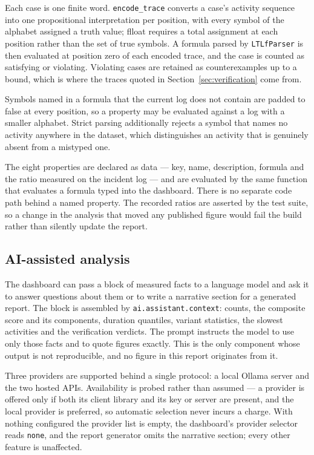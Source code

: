 \documentclass[12pt,a4paper]{article}
\begin{document}
Each case is one finite word. \texttt{encode\_trace} converts a case's activity
sequence into one propositional interpretation per position, with every symbol
of the alphabet assigned a truth value; flloat requires a total assignment at
each position rather than the set of true symbols. A formula parsed by
\texttt{LTLfParser} is then evaluated at position zero of each encoded trace,
and the case is counted as satisfying or violating. Violating cases are retained
as counterexamples up to a bound, which is where the traces quoted in
Section~\ref{sec:verification} come from.

Symbols named in a formula that the current log does not contain are padded to
false at every position, so a property may be evaluated against a log with a
smaller alphabet. Strict parsing additionally rejects a symbol that names no
activity anywhere in the dataset, which distinguishes an activity that is
genuinely absent from a mistyped one.

The eight properties are declared as data --- key, name, description, formula
and the ratio measured on the incident log --- and are evaluated by the same
function that evaluates a formula typed into the dashboard. There is no separate
code path behind a named property. The recorded ratios are asserted by the test
suite, so a change in the analysis that moved any published figure would fail
the build rather than silently update the report.

\subsection{AI-assisted analysis}

The dashboard can pass a block of measured facts to a language model and ask it
to answer questions about them or to write a narrative section for a generated
report. The block is assembled by \texttt{ai.assistant.context}: counts, the
composite score and its components, duration quantiles, variant statistics, the
slowest activities and the verification verdicts. The prompt instructs the model
to use only those facts and to quote figures exactly. This is the only component
whose output is not reproducible, and no figure in this report originates from
it.

Three providers are supported behind a single protocol: a local Ollama server
and the two hosted APIs. Availability is probed rather than assumed --- a
provider is offered only if both its client library and its key or server are
present, and the local provider is preferred, so automatic selection never
incurs a charge. With nothing configured the provider list is empty, the
dashboard's provider selector reads \texttt{none}, and the report generator
omits the narrative section; every other feature is unaffected.
\end{document}
